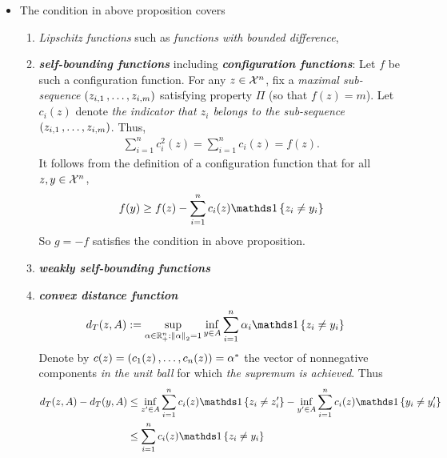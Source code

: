 \documentclass[11pt]{article}
\begin{document}
\begin{itemize}
\item \begin{remark}
The condition in above proposition covers 
\begin{enumerate}
\item \emph{Lipschitz functions} such as \emph{functions with bounded difference},  
\item \emph{\textbf{self-bounding functions}} including \emph{\textbf{configuration functions}}:
Let $f$ be such a configuration function. For any $z \in {\mathcal X}^n$, fix a \emph{maximal sub-sequence} $(z_{i,1} \,{,}\ldots{,}\, z_{i,m})$ satisfying property $\Pi$ (so that $f(z) = m$). Let $c_i(z)$ denote \emph{the indicator that $z_i$ belongs to the sub-sequence} $(z_{i,1} \,{,}\ldots{,}\, z_{i,m})$. Thus,
\begin{align*}
\sum_{i=1}^n c_i^2(z) = \sum_{i=1}^n c_i(z) = f(z).
\end{align*} It follows from the definition of a configuration function that for all $z, y \in {\mathcal X}^n$,
\begin{align*}
f(y) \ge f(z) -  \sum_{i=1}^n c_i(z)\ind{z_i \neq y_i}
\end{align*} So $g = -f$ satisfies the condition in above proposition. 
\item  \emph{\textbf{weakly self-bounding functions}}
\item \emph{\textbf{convex distance function}}
\begin{align*}
d_{T}(z, A) &:= \sup_{\alpha \in \bR_{+}^{n}: \norm{\alpha}{2} = 1}\inf_{y \in A}\sum_{i=1}^n\alpha_i \ind{z_i \neq y_i}
\end{align*} Denote by $c(z) = (c_1(z) \,{,}\ldots{,}\, c_n(z)) = \alpha^{*}$ the vector of nonnegative components \emph{in the unit ball} for which \emph{the supremum is achieved}.  Thus
\begin{align*}
d_{T}(z, A) - d_{T}(y, A) &\le  \inf_{z' \in A}\sum_{i=1}^n c_i(z) \ind{z_i \neq z_i'} -  \inf_{y' \in A}\sum_{i=1}^n c_i(z) \ind{y_i \neq y_i'}\\
&\le \sum_{i=1}^n c_i(z) \ind{z_i \neq y_i}
\end{align*}
\end{enumerate}


\end{remark}
\end{itemize}
\end{document}
